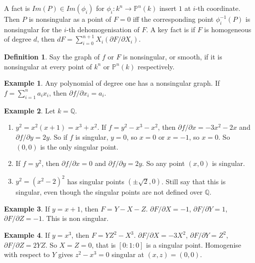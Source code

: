 \documentclass{article}
\newcommand{\Q}{\mathbb{Q}}
\renewcommand{\P}{\mathbb{P}}
\newcommand{\rb}[1]{\left( #1 \right)}
\renewcommand{\sb}[1]{\left[ #1 \right]}
\theoremstyle{definition}\newtheorem{definition}{Definition}[section]
\theoremstyle{definition}\newtheorem{remark}[definition]{Remark}
\theoremstyle{definition}\newtheorem*{example}{Example}
\theoremstyle{definition}\newtheorem*{note}{Note}
\begin{document}
A fact is $ Im\rb{P} \in Im\rb{\phi_i} $ for $ \phi_i : k^n \to \P^n\rb{k} $ insert $ 1 $ at $ i $-th coordinate. Then $ P $ is nonsingular as a point of $ F = 0 $ iff the corresponding point $ \phi_i^{-1}\rb{P} $ is nonsingular for the $ i $-th dehomogenisation of $ F $. A key fact is if $ F $ is homogeneous of degree $ d $, then $ dF = \sum_{i = 0}^{n + 1} X_i\rb{\partial F / \partial X_i} $.

\begin{definition}
Say the graph of $ f $ or $ F $ is nonsingular, or smooth, if it is nonsingular at every point of $ k^n $ or $ \P^n\rb{k} $ respectively.
\end{definition}

\begin{example}
Any polynomial of degree one has a nonsingular graph. If $ f = \sum_{i = 1}^n a_ix_i $, then $ \partial f / \partial x_i = a_i $.
\end{example}

\begin{example}
Let $ k = \Q $.
\begin{enumerate}
\item $ y^2 = x^2\rb{x + 1} = x^3 + x^2 $. If $ f = y^2 - x^3 - x^2 $, then $ \partial f / \partial x = -3x^2 - 2x $ and $ \partial f / \partial y = 2y $. So if $ f $ is singular, $ y = 0 $, so $ x = 0 $ or $ x = -1 $, so $ x = 0 $. So $ \rb{0, 0} $ is the only singular point.
\item If $ f = y^2 $, then $ \partial f / \partial x = 0 $ and $ \partial f / \partial y = 2y $. So any point $ \rb{x, 0} $ is singular.
\item $ y^2 = \rb{x^2 - 2}^2 $ has singular points $ \rb{\pm \sqrt{2}, 0} $. Still say that this is singular, even though the singular points are not defined over $ \Q $.
\end{enumerate}
\end{example}

\begin{example}
If $ y = x + 1 $, then $ F = Y - X - Z $. $ \partial F / \partial X = -1 $, $ \partial F / \partial Y = 1 $, $ \partial F / \partial Z = -1 $. This is non singular.
\end{example}

\begin{example}
If $ y = x^3 $, then $ F = YZ^2 - X^3 $. $ \partial F / \partial X = -3X^2 $, $ \partial F / \partial Y = Z^2 $, $ \partial F / \partial Z = 2YZ $. So $ X = Z = 0 $, that is $ \sb{0 : 1 : 0} $ is a singular point. Homogenise with respect to $ Y $ gives $ z^2 - x^3 = 0 $ singular at $ \rb{x, z} = \rb{0, 0} $.
\end{example}
\end{document}
